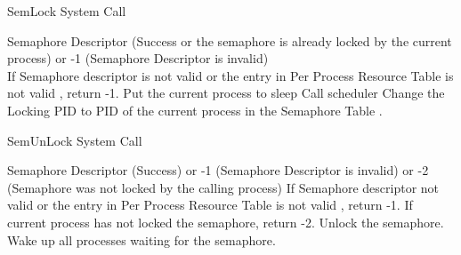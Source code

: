 
\begin{algorithm}
\caption{SemLock System Call}
\begin{algorithmic}
\REQUIRE Semaphore Descriptor
 (Success or the semaphore is already locked by the current process) or -1 (Semaphore Descriptor is invalid)
\\
\STATE If Semaphore descriptor is not valid or the entry in Per Process Resource Table is not valid , return -1.
    \STATE Put the current process to sleep 
    \STATE Call scheduler
\ENDWHILE
\STATE Change the Locking PID to PID of the current process in the Semaphore Table .
\end{algorithmic}
\end{algorithm}


\begin{algorithm}
\caption{SemUnLock System Call}
\begin{algorithmic}
\REQUIRE Semaphore Descriptor
 (Success) or -1 (Semaphore Descriptor is invalid) or -2 (Semaphore was not locked by the calling process)
\STATE If Semaphore descriptor not valid or the entry in Per Process Resource Table is not valid , return -1.
    \STATE If current process has not locked the semaphore, return -2.
    \STATE Unlock the semaphore.
    \STATE Wake up all processes waiting for the semaphore.
\ENDIF
{}
\end{algorithmic}
\end{algorithm}




